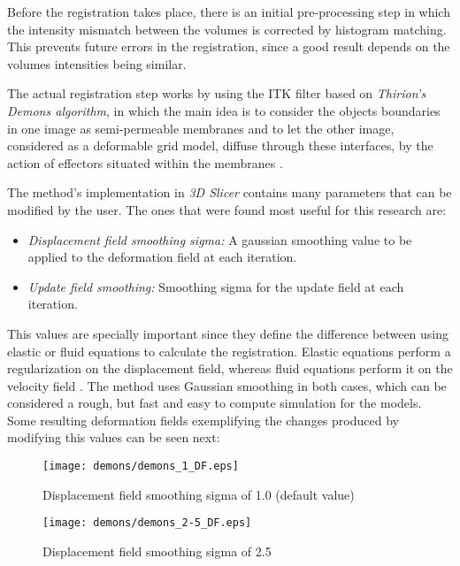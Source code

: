 Before the registration takes place, there is an initial
pre-processing step in which the intensity mismatch between the
volumes is corrected by histogram matching. This prevents future
errors in the registration, since a good result depends on the volumes
intensities being similar.


The actual registration step works by using the ITK filter based on
\textit{Thirion's Demons algorithm}, in which the main idea is to
consider the objects boundaries in one image as semi-permeable
membranes and to let the other image, considered as a deformable grid
model, diffuse through these interfaces, by the action of effectors
situated within the membranes \cite{thirion}.


The method's implementation in \textit{3D Slicer} contains many
parameters that can be modified by the user. The ones that were found
most useful for this research are:
\begin{itemize}
\item \textit{Displacement field smoothing sigma:} A gaussian
  smoothing value to be applied to the deformation field at each
  iteration.
\item \textit{Update field smoothing:} Smoothing sigma for the update
  field at each iteration.
\end{itemize}

This values are specially important since they define the difference
between using elastic or fluid equations to calculate the
registration. Elastic equations perform a regularization on the
displacement field, whereas fluid equations perform it on the velocity
field \cite{pennec}. The method uses Gaussian smoothing in both cases,
which can be considered a rough, but fast and easy to compute
simulation for the models.\\

Some resulting deformation fields exemplifying the changes produced by
modifying this values can be seen next:

\begin{figure}[H]
  \centering
  \texttt{[image: demons/demons\_1\_DF.eps]}
  \caption{Displacement field smoothing sigma of 1.0 (default value)}
  \label{df_1}
\end{figure}

\begin{figure}[H]
  \centering
  \texttt{[image: demons/demons\_2-5\_DF.eps]}
  \caption{Displacement field smoothing sigma of 2.5}
  \label{df_2}
\end{figure}

